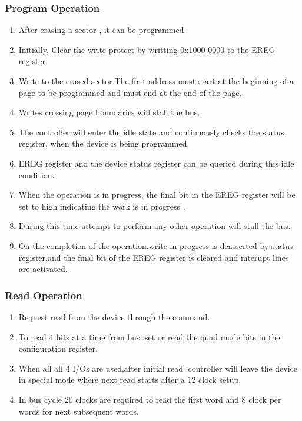 \documentclass[12pt,a4paper]{report}
\begin{document}
\subsubsection{ Program Operation}

\begin{enumerate}[font=$\bullet$\scshape\bfseries]
	\item []After erasing a sector , it can be programmed.
	\item []Initially, Clear the write protect by writting 0x1000 0000 to the EREG register.
	\item []Write to the erased sector.The first address must start at the beginning of a page to be programmed and must end at the end of the page. 
	\item []Writes crossing page boundaries will stall the bus.
	\item []The controller will enter the idle state and continuously checks the status register, when the device is being programmed.
	\item []EREG register and the device status register can be queried during this idle condition.
	\item []When the operation is in progress, the final bit in the EREG register will be set to high indicating the work is in progress .
	\item []During this time attempt to perform any other operation will stall the bus.
	\item []On the completion of the operation,write in progress is deasserted by status register,and the final bit of the EREG register is cleared and interupt lines are activated.
\end{enumerate}
\subsubsection{ Read Operation}

\begin{enumerate}[font=$\bullet$\scshape\bfseries]
	\item []Request read from the device through the command.
	\item []To read 4 bits at a time from bus ,set or read the quad mode bits in the configuration register.
	\item []When all all 4 I/Os are used,after initial read ,controller will leave the device in special mode where next read starts after a 12 clock setup.
	\item []In bus cycle 20 clocks are required to read the first word and 8 clock per words for next subsequent words.  
\end{enumerate}
\end{document}
